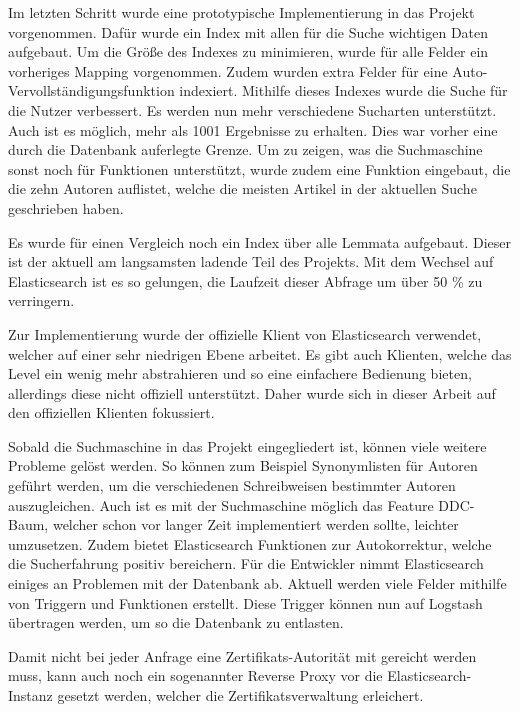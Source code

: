 Im letzten Schritt wurde eine prototypische Implementierung in das Projekt vorgenommen. Dafür wurde ein Index mit allen für die Suche wichtigen Daten aufgebaut. Um die Größe des Indexes zu minimieren, wurde für alle Felder ein vorheriges Mapping vorgenommen. Zudem wurden extra Felder für eine Auto-Vervollständigungsfunktion indexiert. Mithilfe dieses Indexes wurde die Suche für die Nutzer verbessert. Es werden nun mehr verschiedene Sucharten unterstützt. Auch ist es möglich, mehr als 1001 Ergebnisse zu erhalten. Dies war vorher eine durch die Datenbank auferlegte Grenze. Um zu zeigen, was die Suchmaschine sonst noch für Funktionen unterstützt, wurde zudem eine Funktion eingebaut, die die zehn Autoren auflistet, welche die meisten Artikel in der aktuellen Suche geschrieben haben. 

Es wurde für einen Vergleich noch ein Index über alle Lemmata aufgebaut. Dieser ist der aktuell am langsamsten ladende Teil des Projekts. Mit dem Wechsel auf Elasticsearch ist es so gelungen, die Laufzeit dieser Abfrage um über 50 \% zu verringern. 

Zur Implementierung wurde der offizielle Klient von Elasticsearch verwendet, welcher auf einer sehr niedrigen Ebene arbeitet. Es gibt auch Klienten, welche das Level ein wenig mehr abstrahieren und so eine einfachere Bedienung bieten, allerdings diese nicht offiziell unterstützt. Daher wurde sich in dieser Arbeit auf den offiziellen Klienten fokussiert. 

Sobald die Suchmaschine in das Projekt eingegliedert ist, können viele weitere Probleme gelöst werden. So können zum Beispiel Synonymlisten für Autoren geführt werden, um die verschiedenen Schreibweisen bestimmter Autoren auszugleichen. Auch ist es mit der Suchmaschine möglich das Feature DDC-Baum, welcher schon vor langer Zeit implementiert werden sollte, leichter umzusetzen. Zudem bietet Elasticsearch Funktionen zur Autokorrektur, welche die Sucherfahrung positiv bereichern. Für die Entwickler nimmt Elasticsearch einiges an Problemen mit der Datenbank ab. Aktuell werden viele Felder mithilfe von Triggern und Funktionen erstellt. Diese Trigger können nun auf Logstash übertragen werden, um so die Datenbank zu entlasten.

Damit nicht bei jeder Anfrage eine Zertifikats-Autorität mit gereicht werden muss, kann auch noch ein sogenannter Reverse Proxy vor die Elasticsearch-Instanz gesetzt werden, welcher die Zertifikatsverwaltung erleichert.